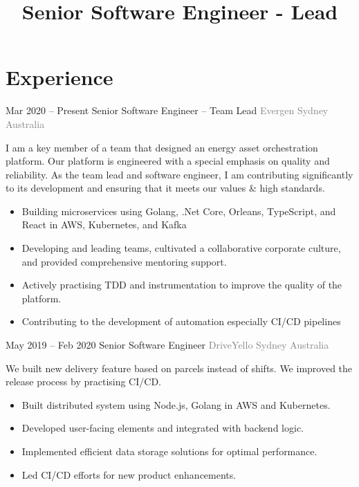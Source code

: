 \documentclass[14pt, a4paper, sans]{moderncv}
\title{Senior Software Engineer - Lead}
\begin{document}
    \makecvtitle

    \section{Experience}\label{sec:experience}

    \cventry
    {Mar 2020 -- Present}
    {Senior Software Engineer -- Team Lead}
    {\newline \textcolor{gray}{Evergen}}
    {\textcolor{gray}{Sydney}}
    {\textcolor{gray}{Australia}}
    {
        \fontsize{13}{16}\selectfont
        I am a key member of a team that designed an energy asset orchestration platform.
        Our platform is engineered with a special emphasis on quality and reliability.
        As the team lead and software engineer, I am contributing significantly to its development and ensuring that it meets our values \& high standards.
        \begin{itemize}
            \item Building microservices using Golang, .Net Core, Orleans, TypeScript, and React in AWS, Kubernetes, and Kafka
            \item Developing and leading teams, cultivated a collaborative corporate culture, and provided comprehensive mentoring support.
            \item Actively practising TDD and instrumentation to improve the quality of the platform.
            \item Contributing to the development of automation especially CI/CD pipelines
        \end{itemize}
    }

    \cventry
    {May 2019 -- Feb 2020}
    {Senior Software Engineer}
    {\newline \textcolor{gray}{DriveYello}}
    {\textcolor{gray}{Sydney}}
    {\textcolor{gray}{Australia}}
    {
        \fontsize{13}{16}\selectfont
        We built new delivery feature based on parcels instead of shifts.
        We improved the release process by practising CI/CD.
        \begin{itemize}
            \item Built distributed system using Node.js, Golang in AWS and Kubernetes.
            \item Developed user-facing elements and integrated with backend logic.
            \item Implemented efficient data storage solutions for optimal performance.
            \item Led CI/CD efforts for new product enhancements.
        \end{itemize}
    }
\end{document}
